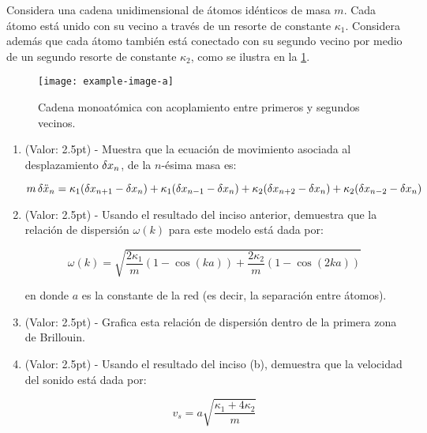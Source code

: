 \documentclass[./../main.tex]{subfiles}
\begin{document}
    \begin{exercise}
        Considera una cadena unidimensional de átomos idénticos de masa \(m\). Cada átomo está unido con su vecino a través de un resorte de constante \(\kappa_{1}\). Considera además que cada átomo también está conectado con su segundo vecino por medio de un segundo resorte de constante \(\kappa_{2}\), como se ilustra en la \cref{fig:monoatomicChain}.

        \begin{figure}[htb]
            \centering
            \texttt{[image: example-image-a]}
            \caption{Cadena monoatómica con acoplamiento entre primeros y segundos vecinos.}
            \label{fig:monoatomicChain}
        \end{figure}

        \begin{enumerate}
            \item (Valor: 2.5pt) - Muestra que la ecuación de movimiento asociada al desplazamiento \(\fdif{x_{n}}\), de la \(n\)-ésima masa es:
            
            \begin{equation*}
                m\fdif{\ddot{x}_{n}} = \kappa_{1}(\fdif{x_{n + 1}} - \fdif{x_{n}}) + \kappa_{1}(\fdif{x_{n - 1}} - \fdif{x_{n}}) + \kappa_{2}(\fdif{x_{n + 2}} - \fdif{x_{n}}) + \kappa_{2}(\fdif{x_{n - 2}} - \fdif{x_{n}})
            \end{equation*}

            \item (Valor: 2.5pt) - Usando el resultado del inciso anterior, demuestra que la relación de dispersión \(\omega(k)\) para este modelo está dada por:
            
            \begin{equation*}
                \omega(k) = \sqrt{\dfrac{2\kappa_{1}}{m}(1 - \cos(ka)) + \dfrac{2\kappa_{2}}{m}(1 - \cos(2ka))}
            \end{equation*}

            en donde \(a\) es la constante de la red (es decir, la separación entre átomos).

            \item (Valor: 2.5pt) - Grafica esta relación de dispersión dentro de la primera zona de Brillouin.
            \item (Valor: 2.5pt) - Usando el resultado del inciso (b), demuestra que la velocidad del sonido está dada por:
            
            \begin{equation*}
                v_{s} = a\sqrt{\dfrac{\kappa_{1} + 4\kappa_{2}}{m}}
            \end{equation*}
        \end{enumerate}
    \end{exercise}
\end{document}
